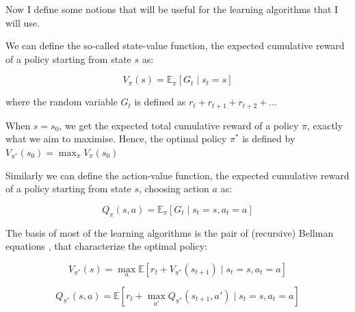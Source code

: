 Now I define some notions that will be useful for the learning algorithms that I will use.


We can define the so-called state-value function, the expected cumulative reward of a policy starting from state $s$ as:

\begin{equation}\label{eq:statevalueFunction}
V_{\pi}(s)=\mathbb{E}_\pi[G_t \mid s_t = s]
\end{equation}

where the random variable $G_t$ is defined as $r_{t} +  r_{t+1} + r_{t+2} + ...$

When $s=s_0$, we get the expected total cumulative reward of a policy $\pi$, exactly what we aim to maximise. Hence, the optimal policy $\pi^*$ is defined by $V_{\pi^*}(s_0)=\max_\pi V_{\pi}(s_0)$


Similarly we can define the action-value function, the expected cumulative reward of a policy starting from state $s$, choosing action $a$ as:

\begin{equation}\label{eq:actionvalueFunction}
Q_{\pi}(s, a)=\mathbb{E}_\pi[G_t \mid s_t = s, a_t = a]
\end{equation}


The basis of most of the learning algorithms is the pair of (recursive) Bellman equations \cite{bellman1957bellmanequation}, that characterize the optimal policy:


\begin{equation}\label{eq:bellmanState}
V_{\pi^*}(s) = \max_a \mathbb{E} [r_t + V_{\pi^*}(s_{t+1}) \mid s_t=s, a_t=a]
\end{equation}


\begin{equation} \label{eq:bellmanAction}
Q_{\pi^*}(s,a) = \mathbb{E} [r_t + \max_{a'} Q_{\pi^*}(s_{t+1},a') \mid s_t=s, a_t=a ] 
\end{equation}

